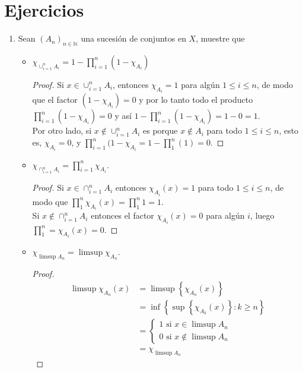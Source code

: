 \documentclass[spanish,12pt,a4paper,openany]{book}
\begin{document}
	\section{Ejercicios}
	\begin{enumerate}
		\item Sean $(A_{n})_{n \in \mathbb{N}}$ una sucesión de conjuntos en $X$, muestre que
			\begin{itemize}
				\item $\chi_{\cup_{i=1}^{n} A_{i}} = 1 - \prod_{i=1}^{n}(1- \chi_{A_{i}})$
				\begin{proof}
					Si $ x \in \cup_{i=1}^{n} A_{i} $, entonces $ \chi_{A_{i}} = 1$ para algún $1 \leq i \leq n$, de modo que el factor $(1- \chi_{A_{i}}) = 0$ y por lo tanto todo el producto $ \prod_{i=1}^{n}(1- \chi_{A_{i}}) = 0 $ y así $1 - \prod_{i=1}^{n}(1- \chi_{A_{i}}) = 1 - 0  = 1.$\\
					Por otro lado, si $x \notin \cup_{i=1}^{n} A_{i}$ es porque $x \notin A_{i}$ para todo $1 \leq i \leq n$, esto es, $ \chi_{A_{i}} = 0$, y $\prod_ {i=1}^{n} (1- \chi_{A_{i}} = 1 - \prod_{1}^{n}(1) = 0.$ 		
				\end{proof}
				\item $\chi_{\cap_{i=1}^{n} A_{i}} = \prod_{i=1}^{n}\chi_{A_{i}}$.
				\begin{proof}
					Si $ x \in \cap_{i=1}^{n} A_{i}$ entonces $\chi_{A_{i}} (x) = 1$ para todo $1 \leq i \leq n$, de modo que $\prod_{1}^{n} \chi_{A_{i}} (x) = \prod_{1}^{n} 1 = 1$. \\
					Si $x \notin \cap_{i=1}^{n} A_{i} $ entonces el factor $\chi_{A_{i}}(x)= 0$ para algún $i$, luego $\prod_{1}^{n} = \chi_{A_{i}} (x) = 0$.
				\end{proof}
				\item $\chi_{ \limsup A_{n}} = \limsup\chi_{A_{n}}$.
				\begin{proof}
					\begin{align*}
						\limsup\chi_{A_{n}} (x) &= \limsup \left\{\chi_{A_{n}} (x)\right\} \\
						&= \inf \left\{\sup \left\{\chi_{A_{k}}(x) \right\} : k \geq n \right\}\\
						&= \begin{cases*}
								1 \text{ si } x \in \limsup{A_{n}}\\
								0 \text{ si } x \notin \limsup A_{n} 
							\end{cases*}\\
						&= \chi _{\limsup A_{n}}
					\end{align*}

\end{proof}
\end{itemize}
\end{enumerate}
\end{document}
